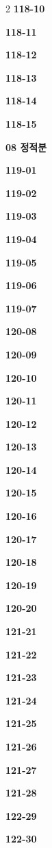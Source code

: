 \documentclass[10pt,a4paper]{article}
\begin{document}
\begin{multicols}{2}
\noindent\textbf{118-10}\ \par
\noindent\textbf{118-11}\ \par
\noindent\textbf{118-12}\ \par
\noindent\textbf{118-13}\ \par
\noindent\textbf{118-14}\ \par
\noindent\textbf{118-15}\ \par
\noindent\textbf{08 정적분}\par\smallskip
\noindent\textbf{119-01}\ \par
\noindent\textbf{119-02}\ \par
\noindent\textbf{119-03}\ \par
\noindent\textbf{119-04}\ \par
\noindent\textbf{119-05}\ \par
\noindent\textbf{119-06}\ \par
\noindent\textbf{119-07}\ \par
\noindent\textbf{120-08}\ \par
\noindent\textbf{120-09}\ \par
\noindent\textbf{120-10}\ \par
\noindent\textbf{120-11}\ \par
\noindent\textbf{120-12}\ \par
\noindent\textbf{120-13}\ \par
\noindent\textbf{120-14}\ \par
\noindent\textbf{120-15}\ \par
\noindent\textbf{120-16}\ \par
\noindent\textbf{120-17}\ \par
\noindent\textbf{120-18}\ \par
\noindent\textbf{120-19}\ \par
\noindent\textbf{120-20}\ \par
\noindent\textbf{121-21}\ \par
\noindent\textbf{121-22}\ \par
\noindent\textbf{121-23}\ \par
\noindent\textbf{121-24}\ \par
\noindent\textbf{121-25}\ \par
\noindent\textbf{121-26}\ \par
\noindent\textbf{121-27}\ \par
\noindent\textbf{121-28}\ \par
\noindent\textbf{122-29}\ \par
\noindent\textbf{122-30}\ \par

\end{multicols}
\end{document}
